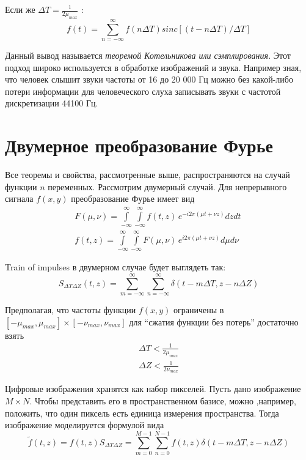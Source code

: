 \documentclass[oneside,final,14pt]{extreport}
\begin{document}
Если же $ \varDelta T = \frac{1}{2 \mu_{max}} $ :
\begin{equation}
f(t) 
=
\sum_{ n = - \infty}^{\infty}
f(n \varDelta T ) 
sinc[ (t - n \varDelta T) / \varDelta T	]  
\end{equation}

Данный вывод называется \textit{теоремой Котельникова или сэмплирования.} 
Этот подход широко используется в обработке изображений и звука. Например зная, что человек слышит звуки частоты от 16 до 20 000 Гц можно без какой-либо потери информации для человеческого слуха записывать звуки с частотой дискретизации 44100 Гц.

\section{Двумерное преобразование Фурье}
Все теоремы и свойства, рассмотренные выше, распространяются на случай функции $n$ переменных. Рассмотрим двумерный случай. Для непрерывного сигнала $f(x,y)$ преобразование Фурье имеет вид
\begin{gather}
\label{FFT_2d}
F(\mu,\nu)
=
\int\limits_{-\infty}^{\infty}
\int\limits_{-\infty}^{\infty}
f(t,z) \,
e^{-i 2 \pi( \mu t + \nu z)}
dz dt~
\\
\label{IFFT_2d}
f(t,z)
=
\int\limits_{-\infty}^{\infty}
\int\limits_{-\infty}^{\infty}
F(\mu,\nu) \,
e^{i 2 \pi( \mu t + \nu z)}
d\mu d\nu~
\end{gather}

Train of impulses в двумерном случае будет выглядеть так:
\begin{equation}
S_{ \varDelta T \varDelta Z }
(t,z)
=
\sum_
{ m = - \infty}^{\infty}
\sum_
{ n = - \infty}^{\infty}
\delta(
t - m \varDelta T,
z - n \varDelta Z
)
\end{equation}

Предполагая, что частоты функции $f(x,y)$ ограничены в $
[- \mu_{max},\mu_{max}] 
\times
[- \nu_{max},\nu_{max}] 
$
для “сжатия функции без потерь” достаточно взять
\begin{gather}
\varDelta T 
<
\frac{1}{2 \mu_{max}}
\\
\varDelta Z 
<
\frac{1}{2 \nu_{max}}
\label{Kotelnicov_imparity}
\end{gather}

Цифровые изображения хранятся как набор пикселей. Пусть дано изображение $M\times N$. Чтобы представить его в пространственном базисе, можно ,например, положить, что один пиксель есть единица измерения пространства. Тогда изображение моделируется формулой вида
\begin{equation}
\tilde{f}(t,z) 
=
f(t,z)
S_{ \varDelta T \varDelta Z }
=
\sum_
{ m =  0}^{M-1}
\sum_
{ n =  0}^{N-1}
f(t,z)\delta(
t - m \varDelta T,
z - n \varDelta Z
)
\label{sample_2d}
\end{equation}
\end{document}
